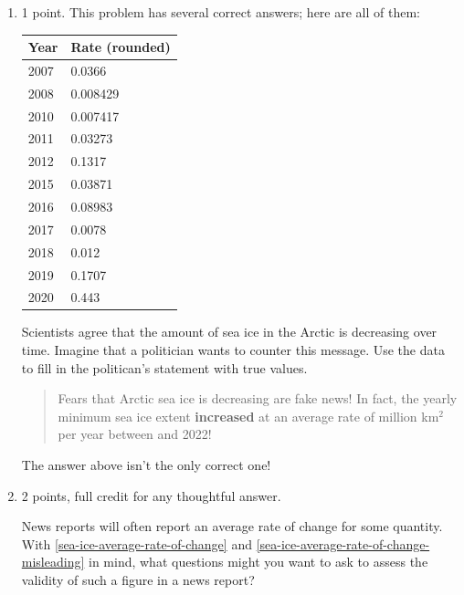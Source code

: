 \documentclass{article}
\begin{document}
\begin{enumerate}
\begin{enumerate}
  \item \label{sea-ice-average-rate-of-change-misleading}

    \begin{grading}
      1 point. This problem has several correct answers; here are all of them: 

      \begin{tabular}{l | l}
        Year & Rate (rounded) \\
        \hline 
        2007 & 0.0366 \\
        2008 & 0.008429 \\
        2010 & 0.007417 \\
        2011 & 0.03273 \\
        2012 & 0.1317 \\
        2015 & 0.03871 \\
        2016 & 0.08983 \\
        2017 & 0.0078 \\
        2018 & 0.012 \\
        2019 & 0.1707 \\
        2020 & 0.443
      \end{tabular}
    \end{grading}

    \begin{problem}[\vfill]
      Scientists agree that the amount of sea ice in the Arctic is decreasing over time. Imagine that a politician wants to counter this message. Use the data to fill in the politican's statement with true values.

      \begin{quote}
        Fears that Arctic sea ice is decreasing are fake news! In fact, the yearly minimum sea ice extent \textbf{increased} at an average rate of  million km$^2$ per year between  and 2022!
      \end{quote}
    \end{problem}

    \begin{solution}
      The answer above isn't the only correct one!
    \end{solution}

  \item

    \begin{grading}
      2 points, full credit for any thoughtful answer.
    \end{grading}

    \begin{problem}[\vfill\newpage]
      News reports will often report an average rate of change for some quantity. With \ref{sea-ice-average-rate-of-change} and \ref{sea-ice-average-rate-of-change-misleading} in mind, what questions might you want to ask to assess the validity of such a figure in a news report?
    \end{problem}


\end{enumerate}
\end{enumerate}
\end{document}
